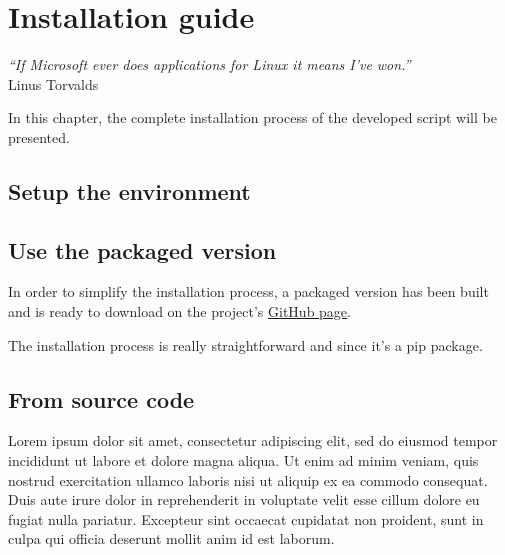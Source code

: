 

\chapter{Installation guide} %
\label{chap:installation}
\begin{flushright}
\textit{``If Microsoft ever does applications for Linux it means I've won.''} \\ Linus Torvalds
\end{flushright}


In this chapter, the complete installation process of the developed script will be presented.

\section {Setup the environment}


\section{Use the packaged version}
In order to simplify the installation process, a packaged version has been built and is ready to download on the project's \href{https://github.com/dchenaux/Yoda}{GitHub page}.

The installation process is really straightforward and since it's a \gls{pip} package.

\section{From source code}
Lorem ipsum dolor sit amet, consectetur adipiscing elit, sed do eiusmod tempor incididunt ut labore et dolore magna aliqua. Ut enim ad minim veniam, quis nostrud exercitation ullamco laboris nisi ut aliquip ex ea commodo consequat. Duis aute irure dolor in reprehenderit in voluptate velit esse cillum dolore eu fugiat nulla pariatur. Excepteur sint occaecat cupidatat non proident, sunt in culpa qui officia deserunt mollit anim id est laborum.
